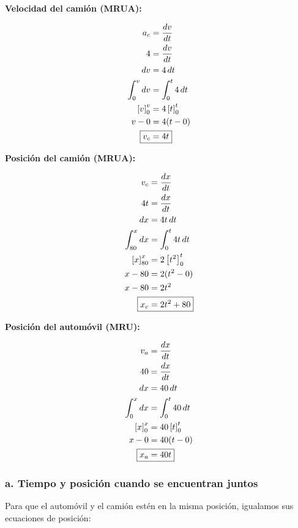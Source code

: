\textbf{Velocidad del camión (MRUA):}
\vspace{-20pt}

\begin{align*}
a_c &= \frac{dv}{dt} \\
4 &= \frac{dv}{dt} \\
dv &= 4\,dt \\
\int_{0}^{v} dv &= \int_{0}^{t} 4\,dt \\
\left[v\right]_{0}^{v} &= 4\left[t\right]_{0}^{t} \\
v - 0 &= 4(t - 0) \\
\Aboxed{v_c &= 4t}
\end{align*}

\textbf{Posición del camión (MRUA):}
\vspace{-20pt}

\begin{align*}
v_c &= \frac{dx}{dt} \\
4t &= \frac{dx}{dt} \\
dx &= 4t\,dt \\
\int_{80}^{x} dx &= \int_{0}^{t} 4t\,dt \\
\left[x\right]_{80}^{x} &= 2\left[t^2\right]_{0}^{t} \\
x - 80 &= 2(t^2 - 0) \\
x - 80 &= 2t^2 \\
\Aboxed{x_c &= 2t^2 + 80}
\end{align*}

\textbf{Posición del automóvil (MRU):}
\vspace{-20pt}

\begin{align*}
v_a &= \frac{dx}{dt} \\
40 &= \frac{dx}{dt} \\
dx &= 40\,dt \\
\int_{0}^{x} dx &= \int_{0}^{t} 40\,dt \\
\left[x\right]_{0}^{x} &= 40\left[t\right]_{0}^{t} \\
x - 0 &= 40(t - 0) \\
\Aboxed{x_a &= 40t}
\end{align*}

\subsubsection*{a. Tiempo y posición cuando se encuentran juntos}

Para que el automóvil y el camión estén en la misma posición, igualamos sus ecuaciones de posición:
\vspace{-20pt}

